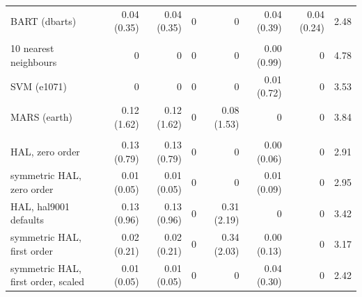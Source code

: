 \begin{table}[!h]
{\begin{tabular}[t]{lrrrrrrr}
\hspace{1em}BART (dbarts) & 0.04 (0.35) & 0.04 (0.35) & 0 & 0 & 0.04 (0.39) & 0.04 (0.24) & 2.48\\
\addlinespace[0.3em]
\multicolumn{8}{l}{\textbf{Other}}\\
\hspace{1em}10 nearest neighbours & 0 & 0 & 0 & 0 & 0.00 (0.99) & 0 & 4.78\\
\hspace{1em}SVM (e1071) & 0 & 0 & 0 & 0 & 0.01 (0.72) & 0 & 3.53\\
\hspace{1em}MARS (earth) & 0.12 (1.62) & 0.12 (1.62) & 0 & 0.08 (1.53) & 0 & 0 & 3.84\\
\addlinespace[0.3em]
\multicolumn{8}{l}{\textbf{HAL}}\\
\hspace{1em}HAL, zero order & 0.13 (0.79) & 0.13 (0.79) & 0 & 0 & 0.00 (0.06) & 0 & 2.91\\
\hspace{1em}symmetric HAL, zero order & 0.01 (0.05) & 0.01 (0.05) & 0 & 0 & 0.01 (0.09) & 0 & 2.95\\
\hspace{1em}HAL, hal9001 defaults & 0.13 (0.96) & 0.13 (0.96) & 0 & 0.31 (2.19) & 0 & 0 & 3.42\\
\hspace{1em}symmetric HAL, first order & 0.02 (0.21) & 0.02 (0.21) & 0 & 0.34 (2.03) & 0.00 (0.13) & 0 & 3.17\\
\hspace{1em}symmetric HAL, first order, scaled & 0.01 (0.05) & 0.01 (0.05) & 0 & 0 & 0.04 (0.30) & 0 & 2.42\\
\bottomrule
\end{tabular}}
\end{table}
